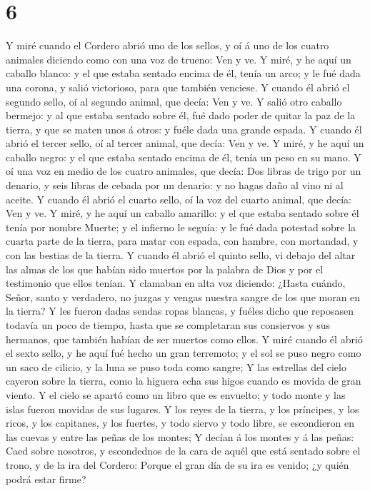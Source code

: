 \hypertarget{section-5}{%
\section{6}\label{section-5}}

 Y miré cuando el Cordero abrió uno de los sellos, y oí á
uno de los cuatro animales diciendo como con una voz de trueno: Ven y
ve.  Y miré, y he aquí un caballo blanco: y el que estaba
sentado encima de él, tenía un arco; y le fué dada una corona, y salió
victorioso, para que también venciese.  Y cuando él abrió
el segundo sello, oí al segundo animal, que decía: Ven y ve.
 Y salió otro caballo bermejo: y al que estaba sentado
sobre él, fué dado poder de quitar la paz de la tierra, y que se maten
unos á otros: y fuéle dada una grande espada.  Y cuando él
abrió el tercer sello, oí al tercer animal, que decía: Ven y ve. Y miré,
y he aquí un caballo negro: y el que estaba sentado encima de él, tenía
un peso en su mano.  Y oí una voz en medio de los cuatro
animales, que decía: Dos libras de trigo por un denario, y seis libras
de cebada por un denario: y no hagas daño al vino ni al aceite.
 Y cuando él abrió el cuarto sello, oí la voz del cuarto
animal, que decía: Ven y ve.  Y miré, y he aquí un caballo
amarillo: y el que estaba sentado sobre él tenía por nombre Muerte; y el
infierno le seguía: y le fué dada potestad sobre la cuarta parte de la
tierra, para matar con espada, con hambre, con mortandad, y con las
bestias de la tierra.  Y cuando él abrió el quinto sello,
vi debajo del altar las almas de los que habían sido muertos por la
palabra de Dios y por el testimonio que ellos tenían.  Y
clamaban en alta voz diciendo: ¿Hasta cuándo, Señor, santo y verdadero,
no juzgas y vengas nuestra sangre de los que moran en la tierra?
 Y les fueron dadas sendas ropas blancas, y fuéles dicho
que reposasen todavía un poco de tiempo, hasta que se completaran sus
consiervos y sus hermanos, que también habían de ser muertos como ellos.
 Y miré cuando él abrió el sexto sello, y he aquí fué
hecho un gran terremoto; y el sol se puso negro como un saco de cilicio,
y la luna se puso toda como sangre;  Y las estrellas del
cielo cayeron sobre la tierra, como la higuera echa sus higos cuando es
movida de gran viento.  Y el cielo se apartó como un
libro que es envuelto; y todo monte y las islas fueron movidas de sus
lugares.  Y los reyes de la tierra, y los príncipes, y
los ricos, y los capitanes, y los fuertes, y todo siervo y todo libre,
se escondieron en las cuevas y entre las peñas de los montes;
 Y decían á los montes y á las peñas: Caed sobre
nosotros, y escondednos de la cara de aquél que está sentado sobre el
trono, y de la ira del Cordero:  Porque el gran día de su
ira es venido; ¿y quién podrá estar firme?

